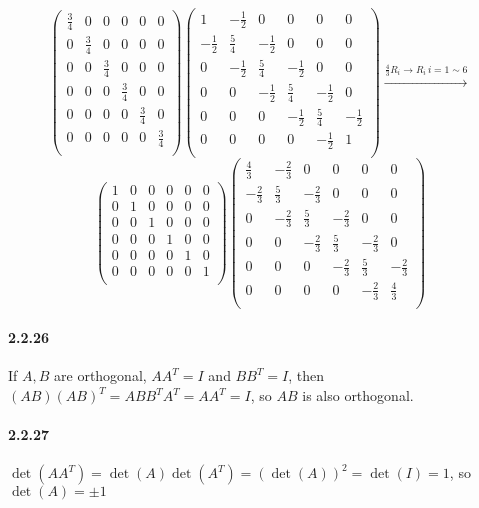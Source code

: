 \documentclass[a4paper]{article}
\begin{document}
\[
\begin{pmatrix}
\frac{3}{4}&0&0&0&0&0\\
0&\frac{3}{4}&0&0&0&0\\
0&0&\frac{3}{4}&0&0&0\\
0&0&0&\frac{3}{4}&0&0\\
0&0&0&0&\frac{3}{4}&0\\
0&0&0&0&0&\frac{3}{4}\\
\end{pmatrix}
\begin{pmatrix}
1&-\frac{1}{2}&0&0&0&0\\
-\frac{1}{2}&\frac{5}{4}&-\frac{1}{2}&0&0&0\\
0&-\frac{1}{2}&\frac{5}{4}&-\frac{1}{2}&0&0\\
0&0&-\frac{1}{2}&\frac{5}{4}&-\frac{1}{2}&0\\
0&0&0&-\frac{1}{2}&\frac{5}{4}&-\frac{1}{2}\\
0&0&0&0&-\frac{1}{2}&1\\
\end{pmatrix}
\xrightarrow{\frac{4}{3}R_i\rightarrow R_i\,i=1\sim 6}
\]
\[
\begin{pmatrix}
1&0&0&0&0&0\\
0&1&0&0&0&0\\
0&0&1&0&0&0\\
0&0&0&1&0&0\\
0&0&0&0&1&0\\
0&0&0&0&0&1\\
\end{pmatrix}
\begin{pmatrix}
\frac{4}{3}&-\frac{2}{3}&0&0&0&0\\
-\frac{2}{3}&\frac{5}{3}&-\frac{2}{3}&0&0&0\\
0&-\frac{2}{3}&\frac{5}{3}&-\frac{2}{3}&0&0\\
0&0&-\frac{2}{3}&\frac{5}{3}&-\frac{2}{3}&0\\
0&0&0&-\frac{2}{3}&\frac{5}{3}&-\frac{2}{3}\\
0&0&0&0&-\frac{2}{3}&\frac{4}{3}\\
\end{pmatrix}
\]

\paragraph{2.2.26}
If $A,B$ are orthogonal, $AA^T=I$ and $BB^T=I$, then $(AB)(AB)^T=ABB^TA^T=AA^T=I$, so $AB$ is also orthogonal.

\paragraph{2.2.27}
$\det(AA^T)=\det(A)\det(A^T)=(\det(A))^2=\det(I)=1$, so $\det(A)=\pm1$
\end{document}
